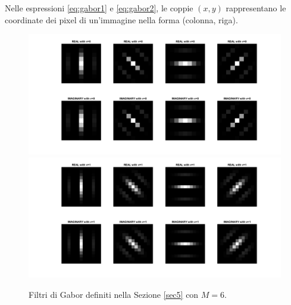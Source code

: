 \documentclass[final]{siamltex}
\begin{document}
Nelle espressioni \eqref{eq:gabor1} e \eqref{eq:gabor2}, le coppie $(x,y)$ rappresentano le coordinate dei pixel di un'immagine nella forma (colonna, riga).
%
\begin{figure}[h!]
\begin{center}
\includegraphics[width=0.9\columnwidth]{Gabor0.png}
\includegraphics[width=0.9\columnwidth]{Gabor1.png}
\caption{Filtri di Gabor definiti nella Sezione \ref{sec5} con $M=6$.}
\label{figura2}
\end{center}
\end{figure}
%
\end{document}
